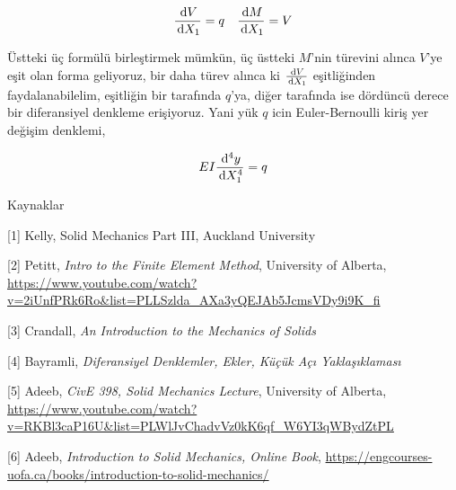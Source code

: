 \documentclass[12pt,fleqn]{article}\usepackage{../../common}
\begin{document}
$$
\frac{\,\mathrm{d} V}{\,\mathrm{d} X_1} = q \quad \frac{\,\mathrm{d} M}{\,\mathrm{d} X_1} = V
$$

Üstteki üç formülü birleştirmek mümkün, üç üstteki $M$'nin türevini
alınca $V$'ye eşit olan forma geliyoruz, bir daha türev alınca ki $\frac{\,\mathrm{d} V}{\,\mathrm{d} X_1}$
eşitliğinden faydalanabilelim, eşitliğin bir tarafında $q$'ya, diğer tarafında
ise dördüncü derece bir diferansiyel denkleme erişiyoruz. Yani yük $q$ icin
Euler-Bernoulli kiriş yer değişim denklemi,

$$
E I \frac{\,\mathrm{d}^4 y}{\,\mathrm{d} X_1^4} = q
$$


Kaynaklar

[1] Kelly, Solid Mechanics Part III, Auckland University

[2] Petitt, {\em Intro to the Finite Element Method}, University of Alberta,
    \url{https://www.youtube.com/watch?v=2iUnfPRk6Ro&list=PLLSzlda_AXa3yQEJAb5JcmsVDy9i9K_fi}

[3] Crandall, {\em An Introduction to the Mechanics of Solids}

[4] Bayramli, {\em Diferansiyel Denklemler, Ekler, Küçük Açı Yaklaşıklaması}

[5] Adeeb, {\em CivE 398, Solid Mechanics Lecture}, University of Alberta,
    \url{https://www.youtube.com/watch?v=RKBl3caP16U&list=PLWlJvChadvVz0kK6qf_W6YI3qWBydZtPL}

[6] Adeeb, {\em Introduction to Solid Mechanics, Online Book},
    \url{https://engcourses-uofa.ca/books/introduction-to-solid-mechanics/}
\end{document}

